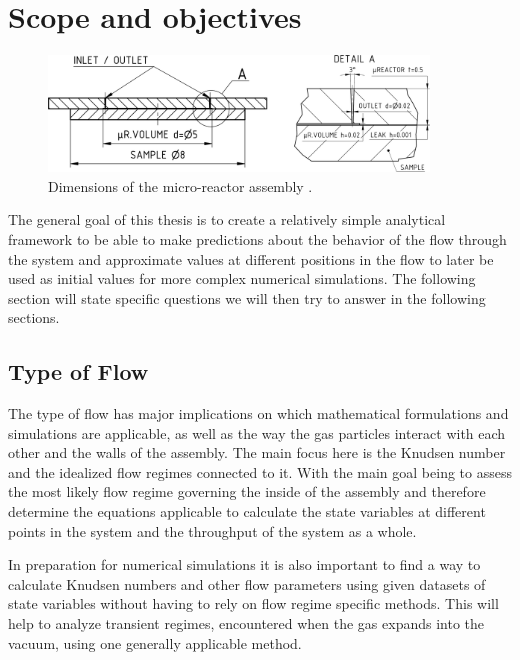 \section{Scope and objectives}
	\begin{figure}[H]
	    \centering
	    \includegraphics[width=0.9\textwidth]{src/02_scope-and-objectives/fig_technical-drawing.png}
	    \caption{Dimensions of the micro-reactor assembly \cite{lagin2025poster}.}
	    \label{fig:technical-drawing}
	\end{figure}
	The general goal of this thesis is to create a relatively simple analytical framework to be able to make predictions about the behavior of the flow through the system and approximate values at different positions in the flow to later be used as initial values for more complex numerical simulations.
	The following section will state specific questions we will then try to answer in the following sections.
	
\subsection{Type of Flow}

	The type of flow has major implications on which mathematical formulations and simulations are applicable, as well as the way the gas particles interact with each other and the walls of the assembly. 
	The main focus here is the Knudsen number and the idealized flow regimes connected to it.
	With the main goal being to assess the most likely flow regime governing the inside of the assembly and therefore determine the equations applicable to calculate the state variables at different points in the system and the throughput of the system as a whole.

	In preparation for numerical simulations it is also important to find a way to calculate Knudsen numbers and other flow parameters using given datasets of state variables without having to rely on flow regime specific methods. This will help to analyze transient regimes, encountered when the gas expands into the vacuum, using one generally applicable method.  

